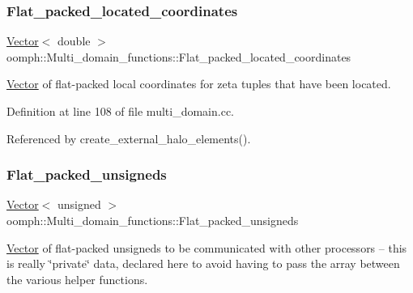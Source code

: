 \mbox{\label{namespaceoomph_1_1Multi__domain__functions_a095771257db01cdebaaf92facc3057a3}} 
\subsubsection{\texorpdfstring{Flat\+\_\+packed\+\_\+located\+\_\+coordinates}{Flat\_packed\_located\_coordinates}}
{\footnotesize\ttfamily \hyperlink{classoomph_1_1Vector}{Vector}$<$ double $>$ oomph\+::\+Multi\+\_\+domain\+\_\+functions\+::\+Flat\+\_\+packed\+\_\+located\+\_\+coordinates}



\hyperlink{classoomph_1_1Vector}{Vector} of flat-\/packed local coordinates for zeta tuples that have been located. 



Definition at line 108 of file multi\+\_\+domain.\+cc.



Referenced by create\+\_\+external\+\_\+halo\+\_\+elements().

\mbox{\label{namespaceoomph_1_1Multi__domain__functions_a5748b2389912d36f8f05cb175105c0a3}} 
\subsubsection{\texorpdfstring{Flat\+\_\+packed\+\_\+unsigneds}{Flat\_packed\_unsigneds}}
{\footnotesize\ttfamily \hyperlink{classoomph_1_1Vector}{Vector}$<$ unsigned $>$ oomph\+::\+Multi\+\_\+domain\+\_\+functions\+::\+Flat\+\_\+packed\+\_\+unsigneds}



\hyperlink{classoomph_1_1Vector}{Vector} of flat-\/packed unsigneds to be communicated with other processors -- this is really \char`\"{}private\char`\"{} data, declared here to avoid having to pass the array between the various helper functions. 



